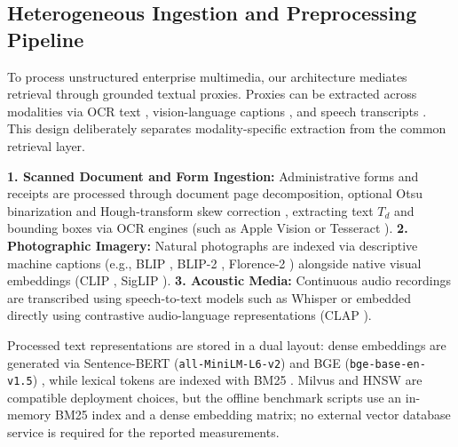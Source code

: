 \documentclass[conference]{IEEEtran}
\begin{document}
\subsection{Heterogeneous Ingestion and Preprocessing Pipeline}
To process unstructured enterprise multimedia, our architecture mediates retrieval through grounded textual proxies. Proxies can be extracted across modalities via OCR text \cite{smith2007tesseract}, vision-language captions \cite{li2022blip}, and speech transcripts \cite{radford2023whisper}. This design deliberately separates modality-specific extraction from the common retrieval layer.

\textbf{1. Scanned Document and Form Ingestion:} Administrative forms and receipts are processed through document page decomposition, optional Otsu binarization \cite{otsu1979} and Hough-transform skew correction \cite{hough1962, fateh2024ocr}, extracting text $T_d$ and bounding boxes via OCR engines (such as Apple Vision or Tesseract \cite{smith2007tesseract}).
\textbf{2. Photographic Imagery:} Natural photographs are indexed via descriptive machine captions (e.g., BLIP \cite{li2022blip}, BLIP-2 \cite{li2023blip2}, Florence-2 \cite{xiao2024florence2}) alongside native visual embeddings (CLIP \cite{radford2021clip}, SigLIP \cite{zhai2023siglip}).
\textbf{3. Acoustic Media:} Continuous audio recordings are transcribed using speech-to-text models such as Whisper \cite{radford2023whisper} or embedded directly using contrastive audio-language representations (CLAP \cite{wu2023clap}).

Processed text representations are stored in a dual layout: dense embeddings are generated via Sentence-BERT (\texttt{all-MiniLM-L6-v2}) \cite{reimers2019sbert} and BGE (\texttt{bge-base-en-v1.5}) \cite{xiao2023bge}, while lexical tokens are indexed with BM25 \cite{robertson2009bm25, robertson1995okapi}. Milvus \cite{wang2021milvus} and HNSW \cite{malkov2020hnsw} are compatible deployment choices, but the offline benchmark scripts use an in-memory BM25 index and a dense embedding matrix; no external vector database service is required for the reported measurements.
\end{document}
